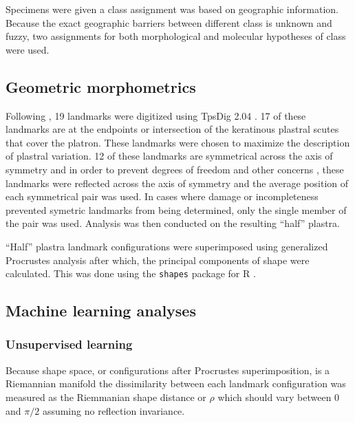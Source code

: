 \documentclass[12pt]{article}\usepackage{graphicx, color}
\begin{document}
Specimens were given a class assignment was based on geographic information. Because the exact geographic barriers between different class is unknown and fuzzy, two assignments for both morphological and molecular hypotheses of class were used. 

\subsection{Geometric morphometrics}
Following \citet{Angielczyk2011}, 19 landmarks were digitized using TpsDig 2.04 \citep{Rohlf2005}. 17 of these landmarks are at the endpoints or intersection of the keratinous plastral scutes that cover the platron. These landmarks were chosen to maximize the description of plastral variation. 12 of these landmarks are symmetrical across the axis of symmetry and in order to prevent degrees of freedom and other concerns \citep{Klingenberg2007}, these landmarks were reflected across the axis of symmetry and the average position of each symmetrical pair was used. In cases where damage or incompleteness prevented symetric landmarks from being determined, only the single member of the pair was used. Analysis was then conducted on the resulting ``half'' plastra.

``Half'' plastra landmark configurations were superimposed using generalized Procrustes analysis \citep{Dryden1998a} after which, the principal components of shape were calculated. This was done using the \texttt{shapes} package for R \citep{2013, Dryden2013}.


\subsection{Machine learning analyses}
\subsubsection{Unsupervised learning}
Because shape space, or configurations after Procrustes superimposition, is a Riemannian manifold \citep{Dryden1998a} the dissimilarity between each landmark configuration was measured as the Riemmanian shape distance or \(\rho\) \citep{Kendall1984a,Dryden1998a} which should vary between 0 and \(\pi / 2\) assuming no reflection invariance.
\end{document}
